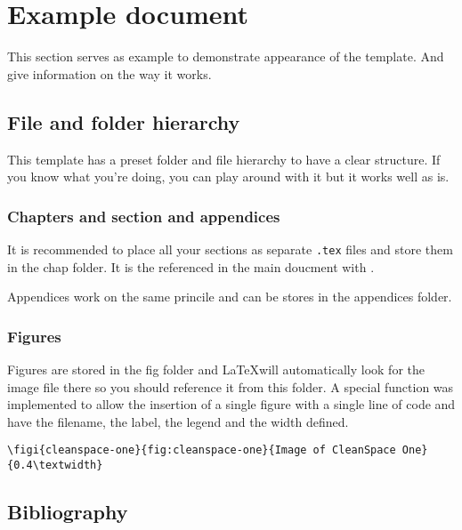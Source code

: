 \section{Example document}

    This section serves as example to demonstrate appearance of the template. And give information on the way it works.

    \subsection{File and folder hierarchy}

        This template has a preset folder and file hierarchy to have a clear structure. If you know what you're doing, you can play around with it but it works well as is.

        \subsubsection{Chapters and section and appendices}

            It is recommended to place all your sections as separate \texttt{.tex} files and store them in the chap folder. It is the referenced in the main doucment with \verb''.

            Appendices work on the same princile and can be stores in the appendices folder.

        \subsubsection{Figures}

            Figures are stored in the fig folder and \LaTeX will automatically look for the image file there so you should reference it from this folder. A special function was implemented to allow the insertion of a single figure with a single line of code and have the filename, the label, the legend and the width defined.

            {\scriptsize\verb'\figi{cleanspace-one}{fig:cleanspace-one}{Image of CleanSpace One}{0.4\textwidth}'}



    \subsection{Bibliography}

